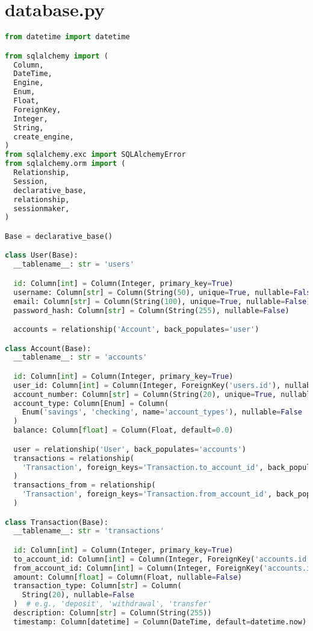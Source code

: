 \section{database.py}
\begin{lstlisting}[language=Python]
from datetime import datetime

from sqlalchemy import (
  Column,
  DateTime,
  Engine,
  Enum,
  Float,
  ForeignKey,
  Integer,
  String,
  create_engine,
)
from sqlalchemy.exc import SQLAlchemyError
from sqlalchemy.orm import (
  Relationship,
  Session,
  declarative_base,
  relationship,
  sessionmaker,
)

Base = declarative_base()

class User(Base):
  __tablename__: str = 'users'

  id: Column[int] = Column(Integer, primary_key=True)
  username: Column[str] = Column(String(50), unique=True, nullable=False)
  email: Column[str] = Column(String(100), unique=True, nullable=False)
  password_hash: Column[str] = Column(String(255), nullable=False)

  accounts = relationship('Account', back_populates='user')

class Account(Base):
  __tablename__: str = 'accounts'

  id: Column[int] = Column(Integer, primary_key=True)
  user_id: Column[int] = Column(Integer, ForeignKey('users.id'), nullable=False)
  account_number: Column[str] = Column(String(20), unique=True, nullable=False)
  account_type: Column[Enum] = Column(
    Enum('savings', 'checking', name='account_types'), nullable=False
  )
  balance: Column[float] = Column(Float, default=0.0)

  user = relationship('User', back_populates='accounts')
  transactions = relationship(
    'Transaction', foreign_keys='Transaction.to_account_id', back_populates='to_account'
  )
  transactions_from = relationship(
    'Transaction', foreign_keys='Transaction.from_account_id', back_populates='from_account'
  )

class Transaction(Base):
  __tablename__: str = 'transactions'

  id: Column[int] = Column(Integer, primary_key=True)
  to_account_id: Column[int] = Column(Integer, ForeignKey('accounts.id'), nullable=False)
  from_account_id: Column[int] = Column(Integer, ForeignKey('accounts.id'), nullable=False)
  amount: Column[float] = Column(Float, nullable=False)
  transaction_type: Column[str] = Column(
    String(20), nullable=False
  )  # e.g., 'deposit', 'withdrawal', 'transfer'
  description: Column[str] = Column(String(255))
  timestamp: Column[datetime] = Column(DateTime, default=datetime.now)


\end{lstlisting}
